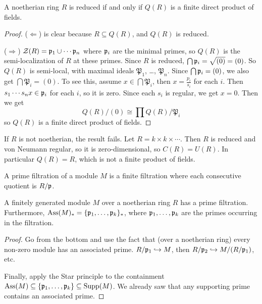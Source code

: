  \begin{theorem}
   A noetherian ring $R$ is reduced if and only if $Q(R)$ is a finite direct product of
   fields.
 \end{theorem}
 \begin{proof}\def\P{\mathfrak{P}}
   ($\Leftarrow$) is clear because $R\subseteq Q(R)$, and $Q(R)$ is reduced.

   ($\Rightarrow$) $\mathcal{Z}(R) = \mathfrak{p}_1\cup \cdots \mathfrak{p}_n$ where $\mathfrak{p}_i$ are the minimal primes, so
   $Q(R)$ is the semi-localization of $R$ at these primes. Since $R$ is reduced, $\bigcap
   \mathfrak{p}_i=\sqrt{(0)}=(0)$. So $Q(R)$ is semi-local, with maximal ideals $\P_1$, \dots,
   $\P_n$. Since $\bigcap \mathfrak{p}_i=(0)$, we also get $\bigcap \P_i=(0)$. To see this, assume
   $x\in \bigcap \P_i$, then $x=\frac{p_i}{s_i}$ for each $i$. Then $s_1\cdots s_n x\in
   \mathfrak{p}_i$ for each $i$, so it is zero. Since each $s_i$ is regular, we get $x=0$.
   Then we get
   \[
    Q(R)/(0) \cong \prod Q(R)/\P_i
   \]
   so $Q(R)$ is a finite direct product of fields.
 \end{proof}
 \begin{example}
   If $R$ is not noetherian, the result fails. Let $R=k\times k\times \cdots$. Then $R$
   is reduced and von Neumann regular, so it is zero-dimensional, so $C(R)=U(R)$. In
   particular $Q(R)=R$, which is not a finite product of fields.
 \end{example}

 \begin{definition}
   A prime filtration of a module $M$ is a finite filtration where each consecutive
   quotient is $R/\mathfrak{p}$.
 \end{definition}
 \begin{theorem}
   A finitely generated module $M$ over a noetherian ring $R$ has a prime filtration.
   Furthermore, $\operatorname{Ass}(M)_* = \{\mathfrak{p}_1,\dots, \mathfrak{p}_k\}_*$, where $\mathfrak{p}_1,\dots, \mathfrak{p}_k$ are the
   primes occurring in the filtration.
 \end{theorem}
 \begin{proof}
   Go from the bottom and use the fact that (over a noetherian ring) every non-zero
   module has an associated prime. $R/\mathfrak{p}_1\hookrightarrow M$, then $R/\mathfrak{p}_2\hookrightarrow
   M/(R/\mathfrak{p}_1)$, etc.

   Finally, apply the Star principle to the containment $\operatorname{Ass} (M)\subseteq \{\mathfrak{p}_1,\dots,
   \mathfrak{p}_k\} \subseteq \operatorname{Supp} (M)$. We already saw that any supporting prime contains an
   associated prime.
 \end{proof}
